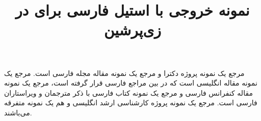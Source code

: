 \documentclass[11pt,a4paper]{article}
\title{نمونه خروجی با استیل فارسی \lr{unsrt-fa} برای \lr{BibTeX} در زی‌پرشین}
\author{}\date{}
\begin{document}
\maketitle

مرجع \cite{Omidali82phdThesis} یک نمونه پروژه دکترا و مرجع\cite{Vahedi87} یک نمونه مقاله مجله فارسی است.
مرجع \cite{Baker02limits} یک نمونه مقاله انگلیسی است که در بین مراجع فارسی قرار گرفته است، مرجع \cite{Amintoosi87afzayesh}  یک نمونه  مقاله کنفرانس فارسی و
مرجع \cite{Pedram80osool} یک نمونه کتاب فارسی با ذکر مترجمان و ویراستاران فارسی است. مرجع \cite{Khalighi07MscThesis} یک نمونه پروژه کارشناسی ارشد انگلیسی و
\cite{Khalighi87xepersian} هم یک نمونه متفرقه  می‌باشند.

{\small


}
\end{document}

